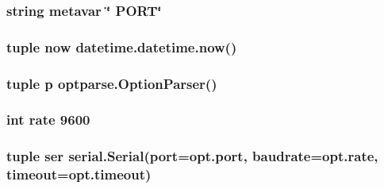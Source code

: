 \hypertarget{namespace_lab1__483__pyinterface_a7f4648aa9e6e34986cab1da2a58baf0a}{
\subsubsection[{metavar}]{\setlength{\rightskip}{0pt plus 5cm}string metavar \char`\"{} P\-O\-R\-T\char`\"{}}}\label{namespace_lab1__483__pyinterface_a7f4648aa9e6e34986cab1da2a58baf0a}
\hypertarget{namespace_lab1__483__pyinterface_af6f11e0c384f23b152f9c45e107496ec}{
\subsubsection[{now}]{\setlength{\rightskip}{0pt plus 5cm}tuple now datetime.\-datetime.\-now()}}\label{namespace_lab1__483__pyinterface_af6f11e0c384f23b152f9c45e107496ec}
\hypertarget{namespace_lab1__483__pyinterface_a92d3a987526d8683f6eb098bc044694c}{
\subsubsection[{p}]{\setlength{\rightskip}{0pt plus 5cm}tuple p optparse.\-Option\-Parser()}}\label{namespace_lab1__483__pyinterface_a92d3a987526d8683f6eb098bc044694c}
\hypertarget{namespace_lab1__483__pyinterface_a7a829e6fd74e94e0edf10550470d844c}{
\subsubsection[{rate}]{\setlength{\rightskip}{0pt plus 5cm}int rate 9600}}\label{namespace_lab1__483__pyinterface_a7a829e6fd74e94e0edf10550470d844c}
\hypertarget{namespace_lab1__483__pyinterface_a7fdd90e0492c95af6bb2d874a5cc4a7e}{
\subsubsection[{ser}]{\setlength{\rightskip}{0pt plus 5cm}tuple ser serial.\-Serial(port=opt.\-port, baudrate=opt.\-rate, {\bf timeout}=opt.\-timeout)}}\label{namespace_lab1__483__pyinterface_a7fdd90e0492c95af6bb2d874a5cc4a7e}
